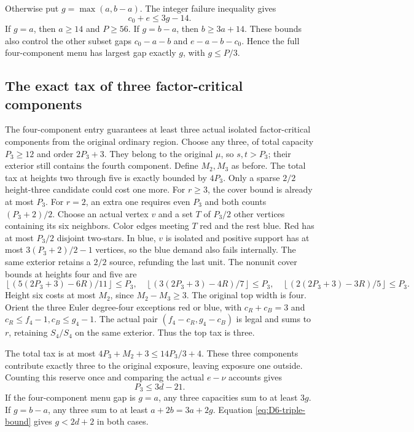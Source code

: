 \documentclass[11pt,a4paper]{article}
\newcommand{\floor}[1]{\left\lfloor#1\right\rfloor}
\theoremstyle{definition}
\begin{document}
Otherwise put $g=\max(a,b-a)$. The integer failure inequality gives
\[
 c_0+e\le3g-14.
\]
If $g=a$, then $a\ge14$ and $P\ge56$. If $g=b-a$, then $b\ge3a+14$. These bounds also control the other subset gaps $c_0-a-b$ and $e-a-b-c_0$. Hence the full four-component menu has largest gap exactly $g$, with $g\le P/3$.

\subsection{The exact tax of three factor-critical components}
The four-component entry guarantees at least three actual isolated factor-critical components from the original ordinary region. Choose any three, of total capacity $P_3\ge12$ and order $2P_3+3$. They belong to the original $\mu$, so $s,t>P_3$; their exterior still contains the fourth component. Define $M_2,M_3$ as before. The total tax at heights two through five is exactly bounded by $4P_3$. Only a sparse $2/2$ height-three candidate could cost one more. For $r\ge3$, the cover bound is already at most $P_3$. For $r=2$, an extra one requires even $P_3$ and both counts $(P_3+2)/2$. Choose an actual vertex $v$ and a set $T$ of $P_3/2$ other vertices containing its six neighbors. Color edges meeting $T$ red and the rest blue. Red has at most $P_3/2$ disjoint two-stars. In blue, $v$ is isolated and positive support has at most $3(P_3+2)/2-1$ vertices, so the blue demand also fails internally. The same exterior retains a $2/2$ source, refunding the last unit. The nonunit cover bounds at heights four and five are
\[
 \floor{(5(2P_3+3)-6R)/11}\le P_3,\quad
 \floor{(3(2P_3+3)-4R)/7}\le P_3,\quad
 \floor{(2(2P_3+3)-3R)/5}\le P_3.
\]
Height six costs at most $M_2$, since $M_2-M_3\ge3$. The original top width is four. Orient the three Euler degree-four exceptions red or blue, with $c_R+c_B=3$ and $c_R\le f_4-1,c_B\le g_4-1$. The actual pair $(f_4-c_R,g_4-c_B)$ is legal and sums to $r$, retaining $S_4/S_4$ on the same exterior. Thus the top tax is three.

The total tax is at most $4P_3+M_2+3\le14P_3/3+4$. These three components contribute exactly three to the original exposure, leaving exposure one outside. Counting this reserve once and comparing the actual $e-\nu$ accounts gives
\begin{equation}\label{eq:D6-triple-bound}
 P_3\le3d-21.
\end{equation}
If the four-component menu gap is $g=a$, any three capacities sum to at least $3g$. If $g=b-a$, any three sum to at least $a+2b=3a+2g$. Equation \eqref{eq:D6-triple-bound} gives $g<2d+2$ in both cases.
\end{document}

